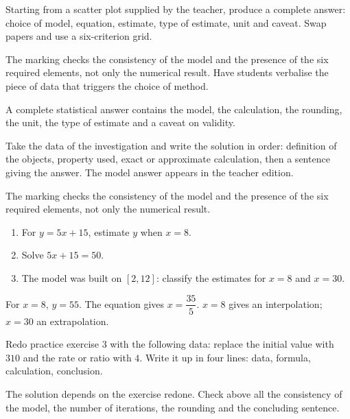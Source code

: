 \begin{activity}
Starting from a scatter plot supplied by the teacher, produce a complete answer: choice of model, equation, estimate, type of estimate, unit and caveat. Swap papers and use a six-criterion grid.

\end{activity}
\begin{solution}The marking checks the consistency of the model and the presence of the six required elements, not only the numerical result. Have students verbalise the piece of data that triggers the choice of method.\end{solution}

\begin{summary}A complete statistical answer contains the model, the calculation, the rounding, the unit, the type of estimate and a caveat on validity.\end{summary}

\begin{example}
Take the data of the investigation and write the solution in order: definition of the objects, property used, exact or approximate calculation, then a sentence giving the answer. The model answer appears in the teacher edition.
\end{example}
\begin{solution}The marking checks the consistency of the model and the presence of the six required elements, not only the numerical result.\end{solution}

\begin{exercise}[essential]
\begin{enumerate}\item For $y=5x+15$, estimate $y$ when $x=8$.\item Solve $5x+15=50$.\item The model was built on $[2,12]$: classify the estimates for $x=8$ and $x=30$.\end{enumerate}
\end{exercise}
\begin{solution}For $x=8$, $y=55$. The equation gives $x=\dfrac{35}{5}$. $x=8$ gives an interpolation; $x=30$ an extrapolation.\end{solution}


\begin{homework}Redo practice exercise 3 with the following data: replace the initial value with $310$ and the rate or ratio with $4$. Write it up in four lines: data, formula, calculation, conclusion.\end{homework}
\begin{solution}The solution depends on the exercise redone. Check above all the consistency of the model, the number of iterations, the rounding and the concluding sentence.\end{solution}

